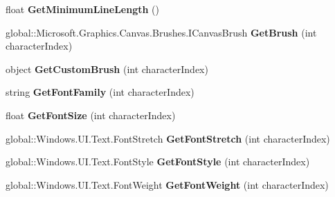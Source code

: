 \begin{DoxyCompactItemize}
float {\bfseries Get\+Minimum\+Line\+Length} ()
\item 
\mbox{\label{class_microsoft_1_1_graphics_1_1_canvas_1_1_text_1_1_canvas_text_layout_a0c810e107e704b45bc815cf10ec80e67}} 
global\+::\+Microsoft.\+Graphics.\+Canvas.\+Brushes.\+I\+Canvas\+Brush {\bfseries Get\+Brush} (int character\+Index)
\item 
\mbox{\label{class_microsoft_1_1_graphics_1_1_canvas_1_1_text_1_1_canvas_text_layout_ab9ac76cc2bcb25f7196995587caf4e68}} 
object {\bfseries Get\+Custom\+Brush} (int character\+Index)
\item 
\mbox{\label{class_microsoft_1_1_graphics_1_1_canvas_1_1_text_1_1_canvas_text_layout_af4f53cf9d9dddc4bfa0669a57c6a4084}} 
string {\bfseries Get\+Font\+Family} (int character\+Index)
\item 
\mbox{\label{class_microsoft_1_1_graphics_1_1_canvas_1_1_text_1_1_canvas_text_layout_a0597b8dfd8edb6f68a71f116703648c7}} 
float {\bfseries Get\+Font\+Size} (int character\+Index)
\item 
\mbox{\label{class_microsoft_1_1_graphics_1_1_canvas_1_1_text_1_1_canvas_text_layout_a7ae8624ebdfdcb49fb9d365b6c8c6404}} 
global\+::\+Windows.\+U\+I.\+Text.\+Font\+Stretch {\bfseries Get\+Font\+Stretch} (int character\+Index)
\item 
\mbox{\label{class_microsoft_1_1_graphics_1_1_canvas_1_1_text_1_1_canvas_text_layout_a84a97afe4a7b871703795677195da761}} 
global\+::\+Windows.\+U\+I.\+Text.\+Font\+Style {\bfseries Get\+Font\+Style} (int character\+Index)
\item 
\mbox{\label{class_microsoft_1_1_graphics_1_1_canvas_1_1_text_1_1_canvas_text_layout_ad0c1b485da46a633fa7740206bc21f8f}} 
global\+::\+Windows.\+U\+I.\+Text.\+Font\+Weight {\bfseries Get\+Font\+Weight} (int character\+Index)

\end{DoxyCompactItemize}
